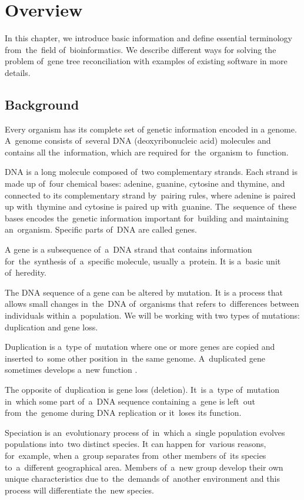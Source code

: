 \chapter{Overview}
In this chapter, we introduce basic information and define essential terminology from~the~field of~bioinformatics. We describe different ways for solving the problem of~gene tree reconciliation with examples of existing software in more details.

\section{Background}
Every organism has its complete set of genetic information encoded in a genome. A~genome consists of~several DNA (deoxyribonucleic acid) molecules and contains all the~information, which are required for~the~organism to~function.

DNA is a long molecule composed of~two complementary strands. Each strand is made up of~four chemical bases: adenine, guanine, cytosine and thymine, and connected to its complementary strand by~pairing rules, where adenine is paired up with~thymine and cytosine is paired up with~guanine. The~sequence of~these bases encodes the~genetic information important for~building and maintaining an~organism. Specific parts of~DNA are called genes.

A gene is a subsequence of~a~DNA strand that contains information for~the~synthesis of~a~specific molecule, usually a~protein. It is a~basic unit of~heredity.

The DNA sequence of a gene can be altered by mutation. It is a process that allows small changes in~the~DNA of~organisms that refers to~differences between individuals within a~population. We will be working with two types of mutations: duplication and gene loss.

Duplication is a~type of~mutation where one or more genes are copied and inserted to~some other position in~the same genome. A~duplicated gene sometimes develops a~new function \cite{doyon}. 

The opposite of~duplication is gene loss (deletion). It~is a~type of~mutation in~which some part of~a~DNA sequence containing a~gene is left~out from~the~genome during DNA replication or it~loses its function. 

Speciation is an~evolutionary process of~in~which a~single population evolves populations into~two distinct species. It can happen for~various reasons, for~example, when a~group separates from~other members of~its species to~a~different geographical area. Members of~a~new group develop their own unique characteristics due to~the~demands of~another environment and this process will differentiate the~new species.

